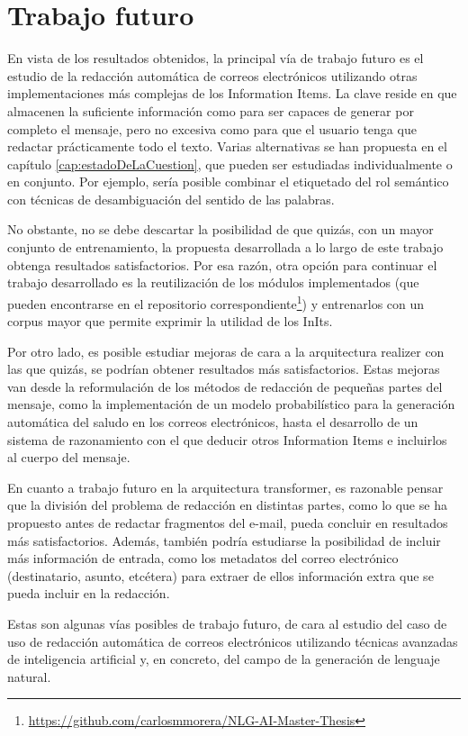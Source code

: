 \section{Trabajo futuro}\label{s:fut}
En vista de los resultados obtenidos, la principal vía de trabajo futuro es el estudio de la redacción automática de correos electrónicos utilizando otras implementaciones más complejas de los Information Items. La clave reside en que almacenen la suficiente información como para ser capaces de generar por completo el mensaje, pero no excesiva como para que el usuario tenga que redactar prácticamente todo el texto. Varias alternativas se han propuesta en el capítulo \ref{cap:estadoDeLaCuestion}, que pueden ser estudiadas individualmente o en conjunto. Por ejemplo, sería posible combinar el etiquetado del rol semántico con técnicas de desambiguación del sentido de las palabras.

No obstante, no se debe descartar la posibilidad de que quizás, con un mayor conjunto de entrenamiento, la propuesta desarrollada a lo largo de este trabajo obtenga resultados satisfactorios. Por esa razón, otra opción para continuar el trabajo desarrollado es la reutilización de los módulos implementados (que pueden encontrarse en el repositorio correspondiente\footnote{\url{https://github.com/carlosmmorera/NLG-AI-Master-Thesis}}) y entrenarlos con un corpus mayor que permite exprimir la utilidad de los InIts.

Por otro lado, es posible estudiar mejoras de cara a la arquitectura realizer con las que quizás, se podrían obtener resultados más satisfactorios. Estas mejoras van desde la reformulación de los métodos de redacción de pequeñas partes del mensaje, como la implementación de un modelo probabilístico para la generación automática del saludo en los correos electrónicos, hasta el desarrollo de un sistema de razonamiento con el que deducir otros Information Items e incluirlos al cuerpo del mensaje.

En cuanto a trabajo futuro en la arquitectura transformer, es razonable pensar que la división del problema de redacción en distintas partes, como lo que se ha propuesto antes de redactar fragmentos del e-mail, pueda concluir en resultados más satisfactorios. Además, también podría estudiarse la posibilidad de incluir más información de entrada, como los metadatos del correo electrónico (destinatario, asunto, etcétera) para extraer de ellos información extra que se pueda incluir en la redacción.

Estas son algunas vías posibles de trabajo futuro, de cara al estudio del caso de uso de redacción automática de correos electrónicos utilizando técnicas avanzadas de inteligencia artificial y, en concreto, del campo de la generación de lenguaje natural.